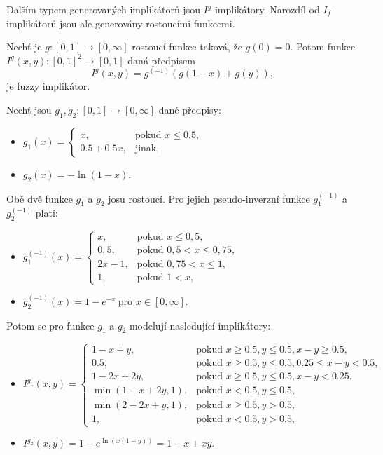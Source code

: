 Dalším typem generovaných implikátor\r u jsou $I^g$ implikátory. Narozdíl od $I_f$ implikátor\r u jsou ale generovány rostoucími funkcemi.

\begin{sentence} \cite{smutna}
    Nech\v t je  $g:[0,1]\rightarrow [0,\infty]$ rostoucí funkce takov\'a, \v ze $g(0)=0$. 
    Potom funkce $I^g(x,y):[0,1]^2 \rightarrow [0,1]$ dan\'a předpisem
    $$I^g(x,y)=g^{(-1)}(g(1-x)+g(y)),$$
    je fuzzy implik\'ator.\\
\end{sentence}

\begin{example}
\cite{Springer}
    Nech\v t jsou $g_1, g_2:[0,1] \rightarrow [0,\infty]$ 
    dan\'e předpisy:
    \begin{itemize}
    \item $g_1(x)=\begin{cases}  x,    &\mbox{pokud $x \leq 0.5$}, \\
    0.5+0.5x,      &\text{jinak,} \end{cases}$
    \item $g_2(x)=-\ln(1-x).$
    \end{itemize}
    Obě dvě funkce $g_1$ a $g_2$ josu rostoucí.
    Pro jejich pseudo-inverzn\'i funkce  $g_1^{(-1)}$ a $g_2^{(-1)}$ plat\'i:
    \begin{itemize}
    \item $g_1^{(-1)}(x)=\begin{cases} x, &\mbox{pokud $x \leq 0,5$}, \\
    0,5,   &\mbox{pokud $0,5 < x \leq 0,75$}, \\
    2x-1,   &\mbox{pokud $0,75 < x \leq 1$}, \\
    1,   &\mbox{pokud $1 < x$}, \end{cases}$
    \item $g_2^{(-1)}(x)=1-e^{-x} ~ \mbox{pro $x \in [0, \infty]$}.$
    \end{itemize}
    Potom se pro funkce $g_1$ a $g_2$ modelují nasleduj\'icí implik\'atory:
    \begin{itemize}
    \item $I^{g_1}(x,y)=\begin{cases}  1-x+y,      &\mbox{pokud $x \geq 0.5, y \leq 0.5, x-y \geq 0.5$}, \\
    0.5,      &\mbox{pokud $x \geq 0.5, y \leq 0.5, 0.25 \leq x-y < 0.5$}, \\
    1-2x+2y,      &\mbox{pokud $x \geq 0.5, y \leq 0.5, x-y < 0.25$}, \\
    \min(1-x+2y,1),       &\mbox{pokud $x < 0.5, y \leq 0.5$}, \\
    \min(2-2x+y,1),       &\mbox{pokud $x \geq 0.5, y>0.5$}, \\
    1,       &\mbox{pokud $x < 0.5, y > 0.5,$} \end{cases}$
    \item $I^{g_2}(x,y)=1-e^{\ln(x(1-y))}=1-x+xy.$
    \end{itemize}
\end{example}

